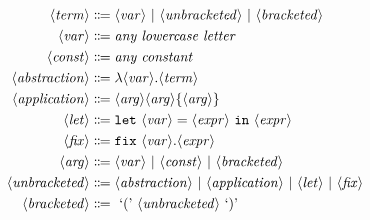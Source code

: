 \begin{align*}
    \langle\mathit{term}\rangle &\Coloneqq \langle\mathit{var}\rangle \ |\  \langle\mathit{unbracketed}\rangle \ |\  \langle\mathit{bracketed}\rangle \\
    \langle\mathit{var}\rangle  &\Coloneqq \textit{any lowercase letter} \\
    \langle\mathit{const}\rangle &\Coloneqq \textit{any constant} \\
    \langle\mathit{abstraction}\rangle &\Coloneqq \lambda \langle\mathit{var}\rangle. \langle\mathit{term}\rangle \\
    \langle\mathit{application}\rangle &\Coloneqq \langle\mathit{arg}\rangle \langle\mathit{arg}\rangle \{\langle\mathit{arg}\rangle\} \\
    \langle\mathit{let}\rangle &\Coloneqq \texttt{let}\ \langle\mathit{var}\rangle = \langle\mathit{expr}\rangle\ \texttt{in}\ \langle\mathit{expr}\rangle \\
    \langle\mathit{fix}\rangle &\Coloneqq \texttt{fix}\ \langle\mathit{var}\rangle. \langle\mathit{expr}\rangle \\
    \langle\mathit{arg}\rangle &\Coloneqq \langle\mathit{var}\rangle \ |\  \langle\mathit{const}\rangle \ |\  \langle\mathit{bracketed}\rangle \\
    \langle\mathit{unbracketed}\rangle &\Coloneqq \langle\mathit{abstraction}\rangle \ |\  \langle\mathit{application}\rangle \ |\  \langle\mathit{let}\rangle \ |\  \langle\mathit{fix}\rangle \\
    \langle\mathit{bracketed}\rangle &\Coloneqq \text{ `(' } \langle\mathit{unbracketed}\rangle \text{ `)' }
\end{align*}

